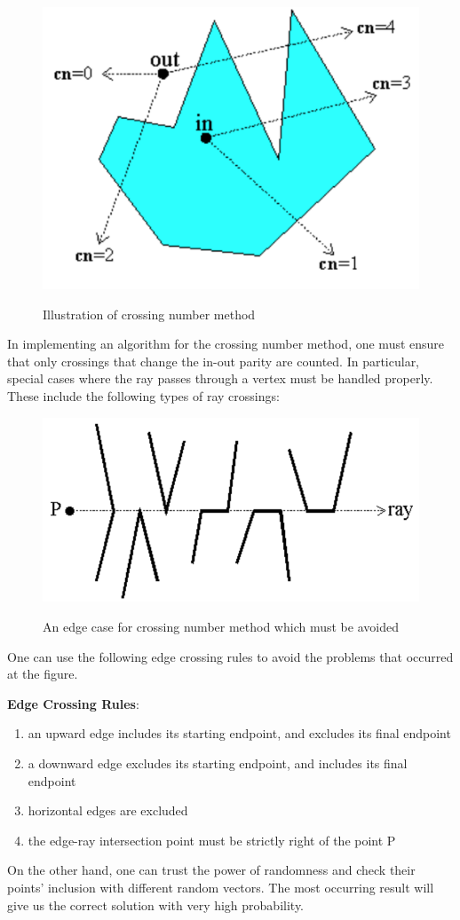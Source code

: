 \documentclass[12pt]{article}
\begin{document}
\begin{figure}[h]
  \centering
  \includegraphics[width=.5\linewidth]{figures/fig10.png}
  \label{fig:11}
  \caption{Illustration of crossing number method}
\end{figure}

In implementing an algorithm for the crossing number method, one must ensure that only 
crossings that change the in-out parity are counted. In particular, special 
cases where the ray passes through a vertex must be handled properly. These 
include the following types of ray crossings:

\begin{figure}[h]
  \centering
  \includegraphics[width=.5\linewidth]{figures/fig11.png}
  \label{fig:12}
  \caption{An edge case for crossing number method which must be avoided}
\end{figure}

One can use the following edge crossing rules to avoid the problems that occurred at the figure.

\textbf{Edge Crossing Rules}:
\begin{enumerate}
  \item an upward edge includes its starting endpoint, and excludes its final endpoint
  \item a downward edge excludes its starting endpoint, and includes its final endpoint
  \item horizontal edges are excluded
  \item the edge-ray intersection point must be strictly right of the point P
\end{enumerate}

On the other hand, one can trust the power of randomness and check their points' inclusion
with different random vectors. The most occurring result will give us the correct solution with very high probability.
\end{document}
